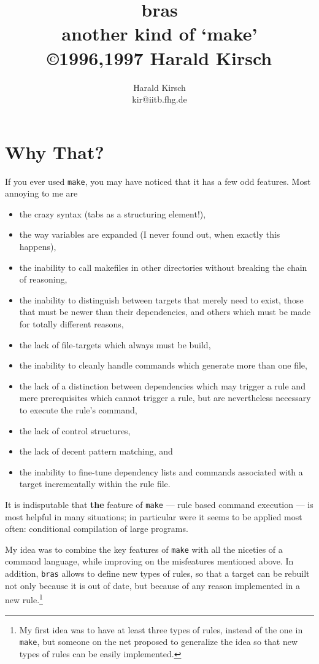 \documentclass[12pt]{article}
\title{\textsf{bras}\\
another kind of `make'\\
\small \copyright 1996,1997 Harald Kirsch}
\author{\relax
Harald Kirsch\\
kir@iitb.fhg.de}
\newcommand{\bras}{\texttt{bras}}
\newcommand{\make}{\texttt{make}}
\begin{document}
\maketitle
\tableofcontents

\section{Why That?}
If you ever used \texttt{make}, you may have noticed that it has a few
odd features. Most annoying to me are

\begin{itemize}
\item 
the crazy syntax (tabs as a structuring element!),
\item 
the way variables are expanded (I never found out, when exactly
this happens),
\item 
the inability to call makefiles in other directories without
breaking the chain of reasoning,
\item 
the inability to distinguish between targets that merely need to
  exist, those that must be newer than their dependencies, and others
  which must be made for totally different reasons,
\item 
the lack of file-targets which always must be build,
\item 
the inability to cleanly handle commands which generate more
than one file,
\item 
the lack of a distinction between dependencies which may trigger
a rule and mere prerequisites which cannot trigger a rule, but are
nevertheless necessary to execute the rule's command,
\item 
the lack of control structures,
\item 
the lack of decent pattern matching, and
\item 
the inability to fine-tune dependency lists and commands associated
with a target incrementally within the rule file.
\end{itemize}

It is indisputable that \textbf{the} feature of \texttt{make} ---
rule based command execution --- is most helpful in many situations;
in particular were it seems to be applied most often:
conditional compilation of large programs.

My idea was to combine the key features of \texttt{make} with all the
niceties of a command language, while improving on the misfeatures
mentioned above. In addition, \bras{} allows to define new types of
rules, so that a target can be rebuilt not only because it is out of
date, but because of any reason implemented in a new rule.\footnote{My
first idea was to have at least three types of rules, instead of the one
in \make{}, but someone on the net proposed to generalize the idea so
that new types of rules can be easily implemented.}
\end{document}
